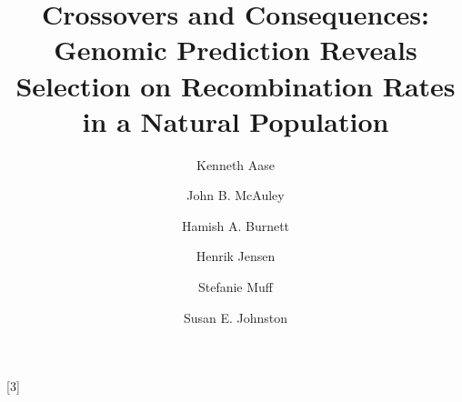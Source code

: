 \usepackage[utf8]{inputenc}
\usepackage[english]{babel}
\usepackage[doublespacing]{setspace}
\usepackage[mathlines]{lineno}
\usepackage{minted}
\usepackage{numprint}
\usepackage{csquotes,xpatch}
\usepackage{fancyhdr,lipsum}
\usepackage{amsmath}
\usepackage{amsfonts}
\usepackage[normalem]{ulem}
\usepackage[color=blue!30!white,textsize=small,textwidth=30mm]{todonotes}
\usepackage[left=2cm,top=2cm,right=3.5cm,bottom=2cm,bindingoffset=0.5cm]{geometry}
\usepackage{bm}
{}

\usepackage{tabularray}
\usepackage{codehigh}
\newcommand{\tinytableTabularrayUnderline}[1]{\underline{#1}}
\newcommand{\tinytableTabularrayStrikeout}[1]{\sout{#1}}
\NewTableCommand{\tinytableDefineColor}[3]{}



\usepackage{authblk}
\title{Crossovers and Consequences: Genomic Prediction Reveals Selection on Recombination Rates in a Natural Population}
\author[1,2,a,*]{Kenneth Aase}
\author[3,a]{John B. McAuley}
\author[2,4]{Hamish A. Burnett}
\author[2,4]{Henrik Jensen}
\author[1,2]{Stefanie Muff}
\author[3]{Susan E. Johnston}
\date{}

\renewcommand\rightmark{Short Title here}

\usepackage{natbib}
\newcommand*{\citef}[1]{\footnote{\cite{#1}}}

%

\newcommand{\E}{\mathsf{E}}
\newcommand{\Prob}{\mathsf{P}}
\newcommand{\Var}{\mathsf{Var}}
\newcommand{\Cov}{\mathsf{Cov}}
\newcommand{\Corr}{\mathsf{Corr}}
\newcommand\given[1][]{\:#1\vert\:}
\newcommand{\N}[2]{\mathsf{N}\left(#1, #2\right)}
\newcommand*\diff{\mathop{}\!\mathrm{d}}
\newcommand{\ie}{\emph{i.e.}}
\newcommand{\eg}{\emph{e.g.}}
\newcommand{\Ie}{\emph{I.e.}}
\newcommand{\Eg}{\emph{E.g.}}
\newcommand{\note}[1]{\textcolor{red}{\scriptsize #1}}
\newcommand{\hl}{\textcolor{blue}}

